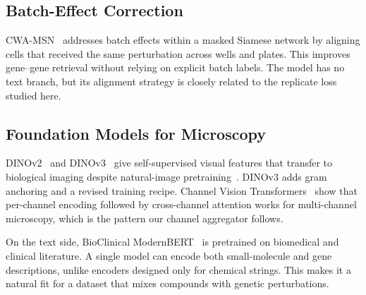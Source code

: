 \subsection{Batch-Effect Correction}

CWA-MSN~\cite{huang2025cwamsn} addresses batch effects within a masked Siamese network by aligning
cells that received the same perturbation across wells and plates. This improves gene--gene
retrieval without relying on explicit batch labels. The model has no text branch, but its alignment
strategy is closely related to the replicate loss studied here.

\subsection{Foundation Models for Microscopy}

DINOv2~\cite{oquab2024dinov2} and DINOv3~\cite{simeoni2025dinov3} give self-supervised visual
features that transfer to biological imaging despite natural-image
pretraining~\cite{moshkov2025ssl}. DINOv3 adds gram anchoring and a revised training recipe.
Channel Vision Transformers~\cite{bao2024channelvit} show that per-channel encoding followed by
cross-channel attention works for multi-channel microscopy, which is the pattern our channel
aggregator follows.

On the text side, BioClinical ModernBERT~\cite{sounack2025bioclinical} is pretrained on biomedical
and clinical literature. A single model can encode both small-molecule and gene descriptions,
unlike encoders designed only for chemical strings. This makes it a natural fit for a dataset that
mixes compounds with genetic perturbations.
